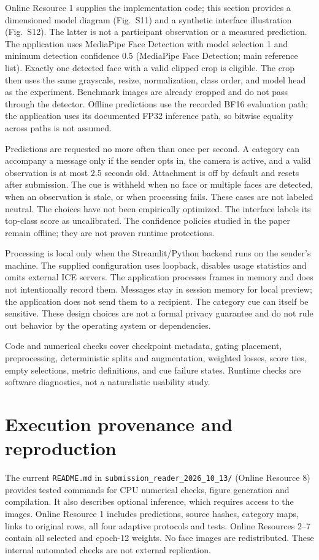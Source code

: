 \documentclass[10pt]{article}
\begin{document}
Online Resource 1 supplies the implementation code; this section provides a dimensioned model diagram (Fig.~S11) and a synthetic interface illustration (Fig.~S12). The latter is not a participant observation or a measured prediction.
The application uses MediaPipe Face Detection with model selection 1 and minimum detection confidence 0.5 (MediaPipe Face Detection; main reference list). Exactly one detected face with a valid clipped crop is eligible. The crop then uses the same grayscale, resize, normalization, class order, and model head as the experiment. Benchmark images are already cropped and do not pass through the detector. Offline predictions use the recorded BF16 evaluation path; the application uses its documented FP32 inference path, so bitwise equality across paths is not assumed.

Predictions are requested no more often than once per second. A category can accompany a message only if the sender opts in, the camera is active, and a valid observation is at most 2.5 seconds old. Attachment is off by default and resets after submission. The cue is withheld when no face or multiple faces are detected, when an observation is stale, or when processing fails. These cases are not labeled neutral. The choices have not been empirically optimized. The interface labels its top-class score as uncalibrated. The confidence policies studied in the paper remain offline; they are not proven runtime protections.

Processing is local only when the Streamlit/Python backend runs on the sender's machine. The supplied configuration uses loopback, disables usage statistics and omits external ICE servers. The application processes frames in memory and does not intentionally record them. Messages stay in session memory for local preview; the application does not send them to a recipient. The category cue can itself be sensitive. These design choices are not a formal privacy guarantee and do not rule out behavior by the operating system or dependencies.

Code and numerical checks cover checkpoint metadata, gating placement, preprocessing, deterministic splits and augmentation, weighted losses, score ties, empty selections, metric definitions, and cue failure states. Runtime checks are software diagnostics, not a naturalistic usability study.

\clearpage\section{Execution provenance and reproduction}\label{supp:provenance}


The current \texttt{README.md} in \texttt{submission\_reader\_2026\_10\_13/} (Online Resource 8) provides tested commands for CPU numerical checks, figure generation and compilation. It also describes optional inference, which requires access to the images. Online Resource 1 includes predictions, source hashes, category maps, links to original rows, all four adaptive protocols and tests. Online Resources 2--7 contain all selected and epoch-12 weights. No face images are redistributed. These internal automated checks are not external replication.
\end{document}
